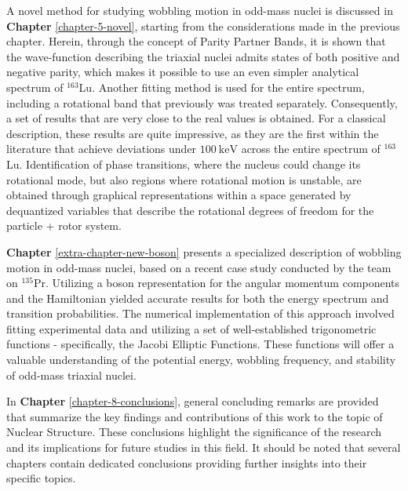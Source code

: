 A novel method for studying wobbling motion in odd-mass nuclei is discussed in \textbf{Chapter} \ref{chapter-5-novel}, starting from the considerations made in the previous chapter. Herein, through the concept of Parity Partner Bands, it is shown that the wave-function describing the triaxial nuclei admits states of both positive and negative parity, which makes it possible to use an even simpler analytical spectrum of $^{163}$Lu. Another fitting method is used for the entire spectrum, including a rotational band that previously was treated separately. Consequently, a set of results that are very close to the real values is obtained. For a classical description, these results are quite impressive, as they are the first within the literature that achieve deviations under $100\ \text{keV}$ across the entire spectrum of $^{163}$Lu. Identification of phase transitions, where the nucleus could change its rotational mode, but also regions where rotational motion is unstable, are obtained through graphical representations within a space generated by dequantized variables that describe the rotational degrees of freedom for the particle + rotor system. 

\textbf{Chapter} \ref{extra-chapter-new-boson} presents a specialized description of wobbling motion in odd-mass nuclei, based on a recent case study conducted by the team on $^{135}$Pr. Utilizing a boson representation for the angular momentum components and the Hamiltonian yielded accurate results for both the energy spectrum and transition probabilities. The numerical implementation of this approach involved fitting experimental data and utilizing a set of well-established trigonometric functions - specifically, the Jacobi Elliptic Functions. These functions will offer a valuable understanding of the potential energy, wobbling frequency, and stability of odd-mass triaxial nuclei.

In \textbf{Chapter} \ref{chapter-8-conclusions}, general concluding remarks are provided that summarize the key findings and contributions of this work to the topic of Nuclear Structure. These conclusions highlight the significance of the research and its implications for future studies in this field. It should be noted that several chapters contain dedicated conclusions providing further insights into their specific topics.%